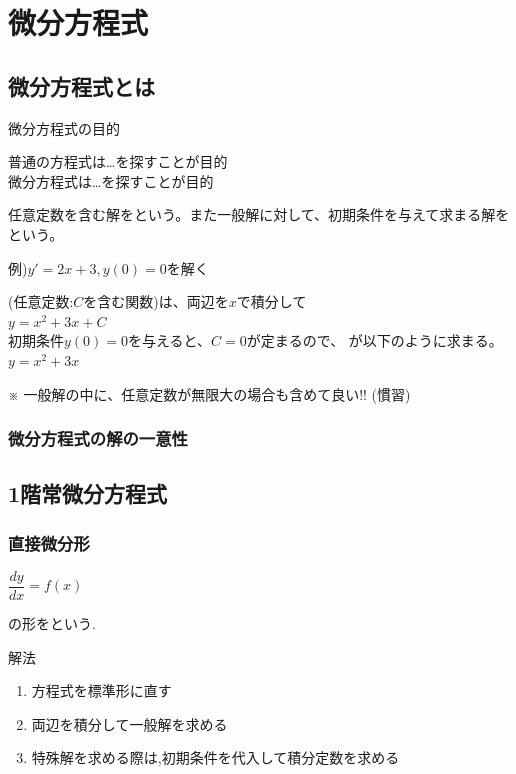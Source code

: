 \documentclass[a4paper]{jsarticle}
\begin{document}
\section{微分方程式}
\subsection{微分方程式とは}
\begin{itembox}[l]{微分方程式の目的}
    \begin{center}
        普通の方程式は\dots\qquad{}を探すことが目的\\
        微分方程式は\dots\qquad{}を探すことが目的
    \end{center}
\end{itembox}
任意定数を含む解をという。また一般解に対して、初期条件を与えて求まる解をという。
\begin{itembox}[l]{例)\quad$y'=2x+3,y\left(0\right)=0$を解く}
    \begin{center}
        (任意定数:$C$を含む関数)は、両辺を$x$で積分して\\
        $y=x^2+3x+C$\\
        初期条件$y\left(0\right)=0$を与えると、$C=0$が定まるので、
        が以下のように求まる。\\
        $y=x^2+3x$
    \end{center}
\end{itembox}
※ 一般解の中に、任意定数が無限大の場合も含めて良い!! (慣習)
\subsubsection{微分方程式の解の一意性}
\subsection{1階常微分方程式}
\subsubsection{直接微分形}
\begin{center}
    $\dfrac{dy}{dx}=f\left(x\right)$
\end{center}
の形をという.
\begin{itembox}[l]{解法}
    \begin{enumerate}[(1)]
        \item 方程式を標準形に直す
        \item 両辺を積分して一般解を求める
        \item 特殊解を求める際は,初期条件を代入して積分定数を求める
    \end{enumerate}
\end{itembox}
\end{document}
